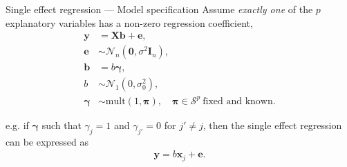 \documentclass[10pt]{beamer}
\begin{document}


\begin{frame}{Single effect regression --- \normalsize Model specification}
    Assume \textit{exactly one} of the $p$ explanatory variables has a non-zero regression coefficient,
    \begin{align}
        \bm{y} & =\bm{Xb} + \bm{e}, \label{eq:sie1}\\
        \bm{e} & \sim \mathcal{N}_n(\bm{0},\sigma^2\bm{I}_n), \\
        \bm{b} & = b\bm{\gamma}, \\
        b & \sim \mathcal{N}_1(0,\sigma^2_0), \\
        \bm{\gamma} & \sim\text{mult}(1,\bm{\pi}),\quad\bm{\pi}\in\mathcal{S}^p~\text{fixed and known}.\label{eq:sie5}
    \end{align}
    
    \medskip
    
    e.g. if $\bm{\gamma}$ such that $\gamma_j=1$ and $\gamma_{j'}=0$ for $j'\neq j$, then the single effect regression can be expressed as
    \begin{gather}
        \bm{y} = b\bm{x}_j + \bm{e}.
    \end{gather}
\end{frame}
\end{document}
